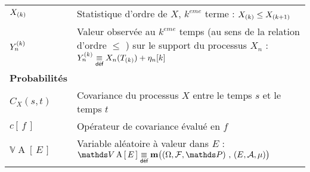 \begin{table}[H]
\begin{tabularx}{\textwidth}{lX}
		$\ordered X k$                                                   & Statistique d'ordre de $X$, $k^{eme}$ terme : $\ordered X {k} \leq \ordered X {k+1}$                                                                                                                                              \\
		$\statrang Y n {k}$                                              & Valeur observée au $k^{eme}$ temps (au sens de la relation d'ordre $\leq$ ) sur le support du processus $X_n$ : $\statrang Y n k \isdef X_n( \ordered T k ) + \eta_{n}[k]$                                                        \\
		\midrule
		\textbf{Probabilités}                                            &                                                                                                                                                                                                                                   \\
		\midrule
		$C_X (s,t)$                                                      & Covariance du processus $X$ entre le temps $s$ et le temps $t$                                                                                                                                                                    \\
		$c\left[ \, f \, \right]$                                        & Opérateur de covariance évalué en $f$                                                                                                                                                                                             \\
		$\mathds V \operatorname{A}\left[ \, E \,\right]$                & Variable aléatoire à valeur dans $E$ : $\mathds V \operatorname{A}\left[ \, E \,\right] \isdef \mathbf m\bigl( \left(\Omega, \mathcal F, \mathds P\right) \, , \, \left(E, \mathcal A, \mu\right) \bigr)$                         \\
		\bottomrule
	\end{tabularx}
\end{table}


